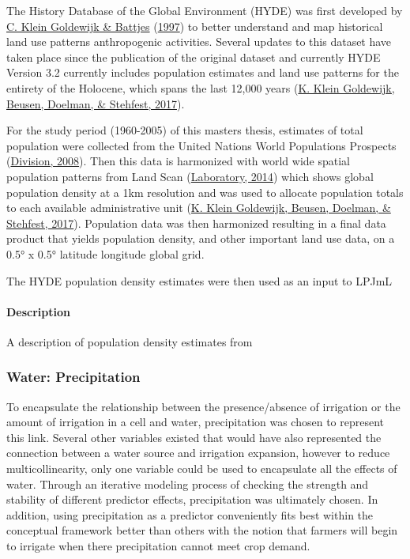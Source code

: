 \documentclass[12pt,twoside]{reedthesis}
\begin{document}
The History Database of the Global Environment (HYDE) was first developed by \protect\hyperlink{ref-kleingoldewijkHundredYear18901997}{C. Klein Goldewijk \& Battjes} (\protect\hyperlink{ref-kleingoldewijkHundredYear18901997}{1997}) to better understand and map historical land use patterns anthropogenic activities. Several updates to this dataset have taken place since the publication of the original dataset and currently HYDE Version 3.2 currently includes population estimates and land use patterns for the entirety of the Holocene, which spans the last 12,000 years (\protect\hyperlink{ref-kleingoldewijkAnthropogenicLandUse2017}{K. Klein Goldewijk, Beusen, Doelman, \& Stehfest, 2017}).

For the study period (1960-2005) of this masters thesis, estimates of total population were collected from the United Nations World Populations Prospects (\protect\hyperlink{ref-unitednationspopulationdivisionWorldPopulationProspects2008}{Division, 2008}). Then this data is harmonized with world wide spatial population patterns from Land Scan (\protect\hyperlink{ref-oakridgenationallaboratoryLandScanLandscanGlobal2014}{Laboratory, 2014}) which shows global population density at a 1km resolution and was used to allocate population totals to each available administrative unit (\protect\hyperlink{ref-kleingoldewijkAnthropogenicLandUse2017}{K. Klein Goldewijk, Beusen, Doelman, \& Stehfest, 2017}). Population data was then harmonized resulting in a final data product that yields population density, and other important land use data, on a 0.5° x 0.5° latitude longitude global grid.

The HYDE population density estimates were then used as an input to LPJmL

\hypertarget{popdensdesc}{%
\paragraph{Description}\label{popdensdesc}}

A description of population density estimates from

\hypertarget{precip}{%
\subsubsection{Water: Precipitation}\label{precip}}

To encapsulate the relationship between the presence/absence of irrigation or the amount of irrigation in a cell and water, precipitation was chosen to represent this link. Several other variables existed that would have also represented the connection between a water source and irrigation expansion, however to reduce multicollinearity, only one variable could be used to encapsulate all the effects of water. Through an iterative modeling process of checking the strength and stability of different predictor effects, precipitation was ultimately chosen. In addition, using precipitation as a predictor conveniently fits best within the conceptual framework better than others with the notion that farmers will begin to irrigate when there precipitation cannot meet crop demand.
\end{document}
